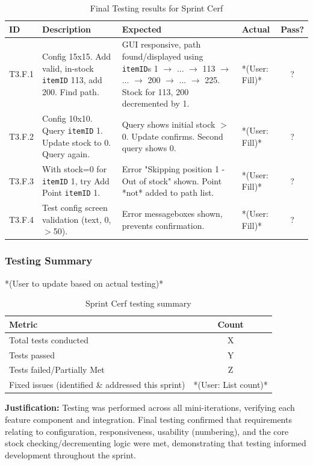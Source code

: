 \begin{table}[htbp] %
	\centering
	\begin{tabularx}{\textwidth}{|l|X|p{3.5cm}|p{3.5cm}|c|}
		\hline
		\textbf{ID} & \textbf{Description} & \textbf{Expected} & \textbf{Actual} & \textbf{Pass?} \\
		\hline
		T3.F.1 & Config 15x15. Add valid, in-stock \verb|itemID| 113, add 200. Find path. & GUI responsive, path found/displayed using \verb|itemID|s 1 $ \rightarrow $ ... $ \rightarrow $ 113 $ \rightarrow $ ... $ \rightarrow $ 200 $ \rightarrow $ ... $ \rightarrow $ 225. Stock for 113, 200 decremented by 1. & *(User: Fill)* & ? \\
		\hline
		T3.F.2 & Config 10x10. Query \verb|itemID| 1. Update stock to 0. Query again. & Query shows initial stock $>$ 0. Update confirms. Second query shows 0. & *(User: Fill)* & ? \\
		\hline
		T3.F.3 & With stock=0 for \verb|itemID| 1, try Add Point \verb|itemID| 1. & Error "Skipping position 1 - Out of stock" shown. Point *not* added to path list. & *(User: Fill)* & ? \\
		\hline
		T3.F.4 & Test config screen validation (text, 0, $>$50). & Error messageboxes shown, prevents confirmation. & *(User: Fill)* & ? \\
		\hline
	\end{tabularx}
	\caption{Final Testing results for Sprint Cerf}
\end{table}

\newpage

\subsubsection{Testing Summary}
*(User to update based on actual testing)*
\begin{table}[htbp]
	\centering
	\begin{tabular}{|l|c|}
		\hline
		\textbf{Metric} & \textbf{Count} \\
		\hline
		Total tests conducted & X \\ %
		\hline
		Tests passed & Y \\
		\hline
		Tests failed/Partially Met & Z \\
		\hline
		Fixed issues (identified \& addressed this sprint) & *(User: List count)* \\
		\hline
	\end{tabular}
	\caption{Sprint Cerf testing summary}
\end{table}
\textbf{Justification:} Testing was performed across all mini-iterations, verifying each feature component and integration. Final testing confirmed that requirements relating to configuration, responsiveness, usability (numbering), and the core stock checking/decrementing logic were met, demonstrating that testing informed development throughout the sprint.


